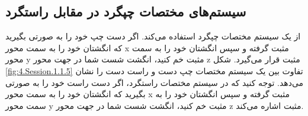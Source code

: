 \subsection{\textbf{سیستم‌های مختصات چپگرد در مقابل راستگرد}}
\label{subsec:1.1.2}
{
    \Large
    \begin{spacing}{1.5}
         از یک سیستم مختصات چپگرد استفاده می‌کند.
        اگر دست چپ خود را به صورتی بگیرید که انگشتان خود را به سمت محور x مثبت گرفته و سپس انگشتان خود را به سمت محور y مثبت خم کنید، انگشت شست شما در جهت محور z مثبت قرار می‌گیرد.
        شکل \ref{fig:4.Session.1.1.5} تفاوت بین یک سیستم مختصات چپ دست و راست دست را نشان می‌دهد.
        توجه کنید که در سیستم مختصات راستگرد، اگر دست راست خود را به صورتی بگیرید که انگشتان خود را به سمت محور x مثبت گرفته و سپس انگشتان خود را به سمت محور y مثبت خم کنید، انگشت شست شما در جهت محور z مثبت اشاره می‌کند.

    \end{spacing}
}

